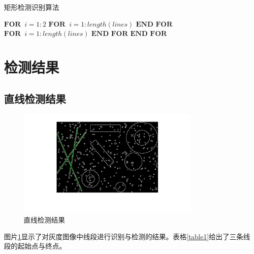 \documentclass[conference]{IEEEtran}
\begin{document}
\begin{algorithm}[H]
    \caption{矩形检测识别算法}\label{alg:tris}
    \begin{algorithmic}
    \STATE 
    \STATE {}
	\STATE {}
	\STATE $ \textbf{FOR} \;\;i = 1: 2$
	\STATE \hspace{0.5cm}
	\STATE \hspace{0.5cm} 
    \STATE \hspace{1cm}$ \textbf{FOR} \;\;i = 1: length(lines)$
    \STATE \hspace{1.5cm}
    \STATE \hspace{1cm}$ \textbf{END FOR}$
	\STATE \hspace{1cm}$ \textbf{FOR} \;\;i = 1: length(lines)$
    \STATE \hspace{1.5cm}
    \STATE \hspace{1cm}$ \textbf{END FOR}$
	\STATE $ \textbf{END FOR}$
    \STATE {}
	\STATE {}
    \end{algorithmic}
\end{algorithm}

\section{检测结果}
\subsection{直线检测结果}
\begin{figure}[htbp]
	\centerline{
		\includegraphics[width=9cm]{lines.png} 	
	}
	\caption{直线检测结果}
	\label{pic2}
\end{figure}
图片\ref{pic2}显示了对灰度图像中线段进行识别与检测的结果。表格\ref{table1}给出了三条线段的起始点与终点。
\end{document}

